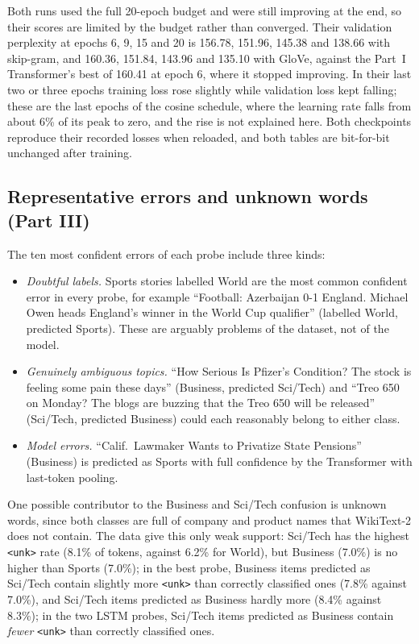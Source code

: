 \documentclass[10pt]{article}
\newcommand{\tok}[1]{\texttt{#1}}
\begin{document}
Both runs used the full 20-epoch budget and were still improving at the end, so their scores are limited by the budget rather than converged. Their validation perplexity at epochs 6, 9, 15 and 20 is 156.78, 151.96, 145.38 and 138.66 with skip-gram, and 160.36, 151.84, 143.96 and 135.10 with GloVe, against the Part~I Transformer's best of 160.41 at epoch 6, where it stopped improving. In their last two or three epochs training loss rose slightly while validation loss kept falling; these are the last epochs of the cosine schedule, where the learning rate falls from about 6\% of its peak to zero, and the rise is not explained here. Both checkpoints reproduce their recorded losses when reloaded, and both tables are bit-for-bit unchanged after training.

\subsection{Representative errors and unknown words (Part III)}\label{app:errors}
The ten most confident errors of each probe include three kinds:
\begin{itemize}
\item \emph{Doubtful labels.} Sports stories labelled World are the most common confident error in every probe, for example ``Football: Azerbaijan 0-1 England. Michael Owen heads England's winner in the World Cup qualifier'' (labelled World, predicted Sports). These are arguably problems of the dataset, not of the model.
\item \emph{Genuinely ambiguous topics.} ``How Serious Is Pfizer's Condition? The stock is feeling some pain these days'' (Business, predicted Sci/Tech) and ``Treo 650 on Monday? The blogs are buzzing that the Treo 650 will be released'' (Sci/Tech, predicted Business) could each reasonably belong to either class.
\item \emph{Model errors.} ``Calif.\ Lawmaker Wants to Privatize State Pensions'' (Business) is predicted as Sports with full confidence by the Transformer with last-token pooling.
\end{itemize}

One possible contributor to the Business and Sci/Tech confusion is unknown words, since both classes are full of company and product names that WikiText-2 does not contain. The data give this only weak support: Sci/Tech has the highest \tok{<unk>} rate (8.1\% of tokens, against 6.2\% for World), but Business (7.0\%) is no higher than Sports (7.0\%); in the best probe, Business items predicted as Sci/Tech contain slightly more \tok{<unk>} than correctly classified ones (7.8\% against 7.0\%), and Sci/Tech items predicted as Business hardly more (8.4\% against 8.3\%); in the two LSTM probes, Sci/Tech items predicted as Business contain \emph{fewer} \tok{<unk>} than correctly classified ones.
\end{document}
